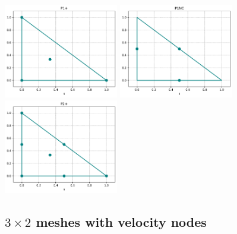 \begin{center}
\includegraphics[width=5cm]{python_codes/fieldstone_120/spaces/P1+_nodes}
\includegraphics[width=5cm]{python_codes/fieldstone_120/spaces/P1NC_nodes}
\includegraphics[width=5cm]{python_codes/fieldstone_120/spaces/P2+_nodes}
\end{center}

\newpage
\subsection*{$3\times 2$ meshes with velocity nodes}

\begin{multicols}{2}


\begin{tiny}

\end{tiny}
\end{multicols}

\begin{multicols}{2}


\begin{tiny}

\end{tiny}
\end{multicols}

